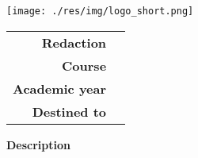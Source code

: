 \thispagestyle{empty}
\begin{titlepage}
	\begin{center}
		\vfill
        \large
		\texttt{[image: ./res/img/logo\_short.png]}
		\vfill
		\begin{Huge}
			\textbf{\docTitle}
		\end{Huge}
		\vfill
		\vspace*{\fill}
		\begin{tabular}{r|l}
			\textbf{Redaction} & \red \\
			\textbf{Course} & \corso \\
			\textbf{Academic year} & \annoAcc \\
			\textbf{Destined to} & \destinatari \\
		\end{tabular}	
		\normalsize
		\vfill
		\textbf{Description}\\
		\textit{\desc} \\
		\vfill
	\end{center}
\end{titlepage}
